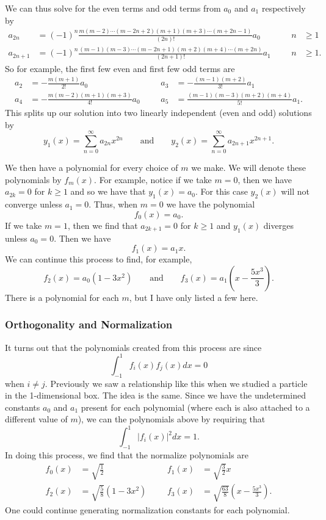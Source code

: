 We can thus solve for the even terms and odd terms from $a_0$ and $a_1$ respectively by
\begin{align*}
    a_{2n} &= (-1)^n \frac{m(m-2)\cdots (m-2n+2)(m+1)(m+3)\cdots (m+2n-1)}{(2n)!}a_0 &&& n&\geq 1\\
    a_{2n+1} &= (-1)^n \frac{(m-1)(m-3)\cdots(m-2n+1)(m+2)(m+4)\cdots (m+2n)}{(2n+1)!}a_1 &&& n&\geq 1.
\end{align*}
So for example, the first few even and first few odd terms are
\begin{align*}
    a_2 &= -\frac{m(m+1)}{2!}a_0 &&& a_3 &= -\frac{(m-1)(m+2)}{3!}a_1\\
    a_4 &= -\frac{m(m-2)(m+1)(m+3)}{4!} a_0 &&& a_5 &= \frac{(m-1)(m-3)(m+2)(m+4)}{5!}a_1.
\end{align*}
This splits up our solution into two linearly independent (even and odd) solutions by
\[
y_1(x)=\sum_{n=0}^\infty a_{2n}x^{2n} \qquad \textrm{and} \qquad y_2(x)=\sum_{n=0}^\infty a_{2n+1}x^{2n+1}.
\]

We then have a polynomial for every choice of $m$ we make.  We will denote these polynomials by $f_m(x)$. For example, notice if we take $m=0$, then we have $a_{2k}=0$ for $k\geq 1$ and so we have that $y_1(x)=a_0$. For this case $y_2(x)$ will not converge unless $a_1=0$.  Thus, when $m=0$ we have the polynomial
\[
f_0(x) = a_0. 
\]
If we take $m=1$, then we find that $a_{2k+1}=0$ for $k\geq 1$ and $y_1(x)$ diverges unless $a_0=0$.  Then we have
\[
f_1(x)= a_1 x.
\]
We can continue this process to find, for example,
\[
f_2(x)=a_0(1-3x^2) \qquad \textrm{and} \qquad f_3(x) = a_1\left( x - \frac{5x^3}{3}\right).
\]
There is a polynomial for each $m$, but I have only listed a few here.

\subsubsection{Orthogonality and Normalization}
It turns out that the polynomials created from this process are  since
\[
\int_{-1}^1 f_i(x)f_j(x)dx = 0
\]
when $i\neq j$.  Previously we saw a relationship like this when we studied a particle in the 1-dimensional box.  The idea is the same.  Since we have the undetermined constants $a_0$ and $a_1$ present for each polynomial (where each is also attached to a different value of $m$), we can  the polynomials above by requiring that
\[
\int_{-1}^1 |f_i(x)|^2 dx = 1.
\]
In doing this process, we find that the normalize polynomials are
\begin{align*}
    f_0(x)&=\sqrt{\frac{1}{2}} &&& f_1(x)&=\sqrt{\frac{3}{2}} x\\
    f_2(x)&= \sqrt{\frac{5}{8}}(1-3x^2) &&& f_3(x)&=\sqrt{\frac{63}{8}}\left( x -\frac{5x^3}{3}\right).
\end{align*}
One could continue generating normalization constants for each polynomial.

